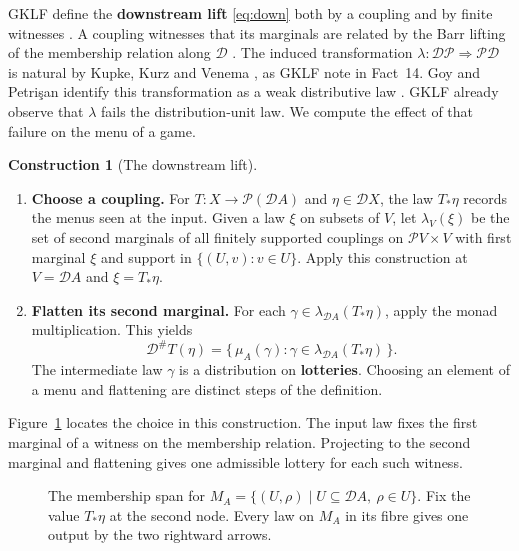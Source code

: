 \documentclass[11pt,a4paper]{article}
\theoremstyle{definition}
\newtheorem*{construction}{Construction}
\newcommand{\D}{\mathcal D}
\newcommand{\Pow}{\mathcal P}
\begin{document}
GKLF define the \textbf{downstream lift} \eqref{eq:down} both by a coupling and by finite witnesses \cite[Definition~11]{gklf}. A coupling witnesses that its marginals are related by the Barr lifting of the membership relation along $\D$ \cite[Section~2]{barr}. The induced transformation $\lambda:\D\Pow\Rightarrow\Pow\D$ is natural by Kupke, Kurz and Venema \cite[Fact~3.14]{kkv}, as GKLF note in Fact~14. Goy and Petri\c{s}an identify this transformation as a weak distributive law \cite[Theorem~3.2]{goy}. GKLF already observe that $\lambda$ fails the distribution-unit law. We compute the effect of that failure on the menu of a game.

\begin{construction}[The downstream lift]\leavevmode
    \begin{enumerate}[titledsteps]
        \item \textbf{Choose a coupling.} For $T:X\to\Pow(\D A)$ and $\eta\in\D X$, the law $T_*\eta$ records the menus seen at the input. Given a law $\xi$ on subsets of $V$, let $\lambda_V(\xi)$ be the set of second marginals of all finitely supported couplings on $\Pow V\times V$ with first marginal $\xi$ and support in $\{(U,v):v\in U\}$. Apply this construction at $V=\D A$ and $\xi=T_*\eta$.

        \item \textbf{Flatten its second marginal.} For each $\gamma\in\lambda_{\D A}(T_*\eta)$, apply the monad multiplication. This yields
        \begin{equation}
            \D^\#T(\eta)=\{\,\mu_A(\gamma):\gamma\in
            \lambda_{\D A}(T_*\eta)\,\}.
            \label{eq:lambda}
        \end{equation}
        The intermediate law $\gamma$ is a distribution on \textbf{lotteries}. Choosing an element of a menu and flattening are distinct steps of the definition.
    \end{enumerate}
\end{construction}

Figure~\ref{fig:membership} locates the choice in this construction. The input law fixes the first marginal of a witness on the membership relation. Projecting to the second marginal and flattening gives one admissible lottery for each such witness.

\begin{figure}[!htbp]
    \centering\small
    \caption{The membership span for $M_A=\{(U,\rho)\mid U\subseteq\D A,\ \rho\in U\}$. Fix the value $T_*\eta$ at the second node. Every law on $M_A$ in its fibre gives one output by the two rightward arrows.}\label{fig:membership}
\end{figure}
\end{document}
